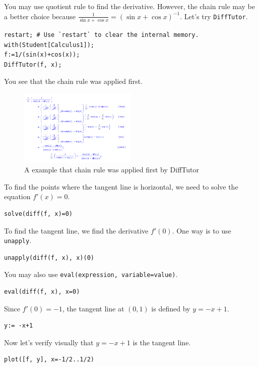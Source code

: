 \documentclass[
  en,11pt,simple]{elegantbook}
\begin{document}
\begin{solution}
{}
You may use quotient rule to find the derivative. However, the chain rule may be a better choice because \(\frac{1}{\sin x+\cos x}=(\sin x+\cos x)^{-1}\). Let's try \texttt{DiffTutor}.

\begin{verbatim}
restart; # Use `restart` to clear the internal memory.
with(Student[Calculus1]);
f:=1/(sin(x)+cos(x));
DiffTutor(f, x);
\end{verbatim}

You see that the chain rule was applied first.

\begin{figure}
\centering
\includegraphics[width=0.5\textwidth,height=\textheight]{figs/DiffTutor-Chain-Rule-Example.png}
\caption{A example that chain rule was applied first by DiffTutor}
\end{figure}

To find the points where the tangent line is horizontal, we need to solve the equation \(f'(x)=0\).

\begin{verbatim}
solve(diff(f, x)=0)
\end{verbatim}

To find the tangent line, we find the derivative \(f'(0)\). One way is to use \texttt{unapply}.

\begin{verbatim}
unapply(diff(f, x), x)(0)
\end{verbatim}

You may also use \texttt{eval(expression,\ variable=value)}.

\begin{verbatim}
eval(diff(f, x), x=0)
\end{verbatim}

Since \(f'(0)=-1\), the tangent line at \((0, 1)\) is defined by \(y=-x+1\).

\begin{verbatim}
y:= -x+1
\end{verbatim}

Now let's verify visually that \(y=-x+1\) is the tangent line.

\begin{verbatim}
plot([f, y], x=-1/2..1/2)
\end{verbatim}
\end{solution}
\end{document}
